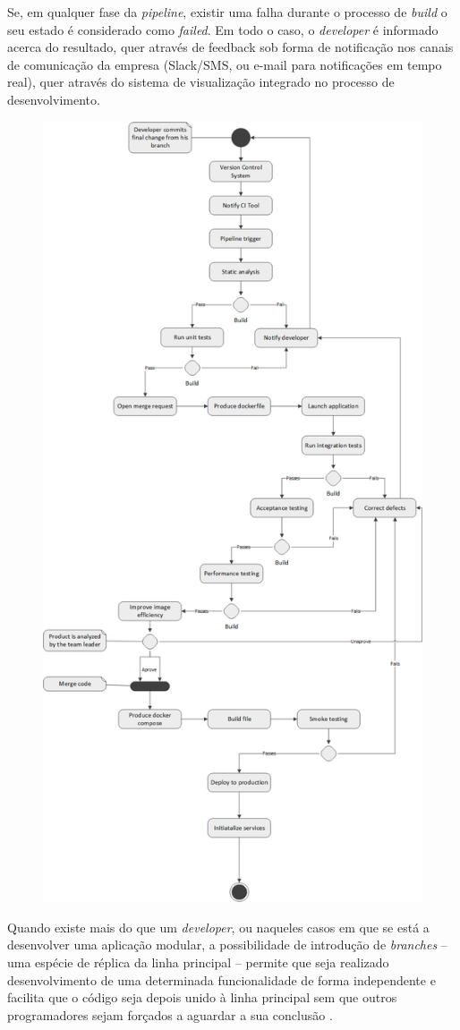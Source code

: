 \hspace{1cm}Se, em qualquer fase da \textit{pipeline}, existir uma falha durante o processo de \textit{build} o seu estado é considerado como \textit{failed}. Em todo o caso, o \textit{developer} é informado acerca do resultado, quer através de feedback sob forma de notificação nos canais de comunicação da empresa (Slack/SMS, ou e-mail para notificações em tempo real), quer através do sistema de visualização integrado no processo de desenvolvimento. 

\begin{figure}
\centering
\includegraphics[width=0.7\linewidth]{Cap2/Pipeline_Workflow_UML.png}
\label{Fig:Fig2}
\end{figure}

\hspace{1cm}Quando existe mais do que um \textit{developer}, ou naqueles casos em que se está a desenvolver uma aplicação modular, a possibilidade de introdução de \textit{branches} -- uma espécie de réplica da linha principal -- permite que seja realizado desenvolvimento de uma determinada funcionalidade de forma independente e facilita que o código seja depois unido à linha principal sem que outros programadores sejam forçados a aguardar a sua conclusão \cite{farley2010contdel}.

